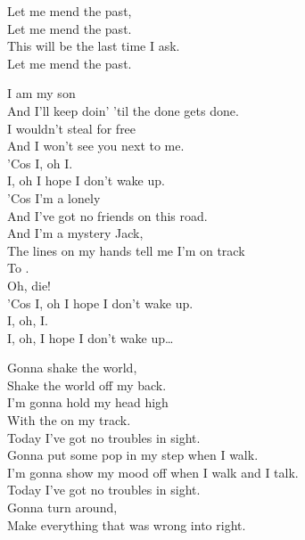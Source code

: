 Let me mend the past, \\
Let me mend the past. \\
This will be the last time I ask. \\
Let me mend the past. \\





I am my  son \\
And I'll keep doin' 'til the done gets done. \\
I wouldn't steal for free \\
And I won't see you next to me. \\

'Cos I, oh I. \\
I, oh I hope I don't wake up. \\

'Cos I'm a lonely  \\
And I've got no friends on this road. \\
And I'm a mystery Jack, \\
The lines on my hands tell me I'm on track \\

To . \\
Oh, die! \\
'Cos I, oh I hope I don't wake up. \\

I, oh, I. \\
I, oh, I hope I don't wake up… \\





Gonna shake the world, \\
Shake the world off my back. \\
I'm gonna hold my head high \\
With the  on my track. \\
Today I've got no troubles in sight. \\

Gonna put some pop in my step when I walk. \\
I'm gonna show my mood off when I walk and I talk. \\
Today I've got no troubles in sight. \\
Gonna turn around, \\
Make everything that was wrong into right. \\

